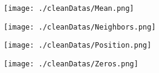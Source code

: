\documentclass[a4paper]{report}
\begin{document}
\newpage
\begin{figure}[h]
\begin{center}
\texttt{[image: ./cleanDatas/Mean.png]}
\end{center}
\end{figure}

\newpage
\begin{figure}[h]
\begin{center}
\texttt{[image: ./cleanDatas/Neighbors.png]}
\end{center}
\end{figure}

\newpage
\begin{figure}[h]
\begin{center}
\texttt{[image: ./cleanDatas/Position.png]}
\end{center}
\end{figure}

\newpage
\begin{figure}[h]
\begin{center}
\texttt{[image: ./cleanDatas/Zeros.png]}
\end{center}
\end{figure}



\tableofcontents
\lstlistoflistings
\end{document}
